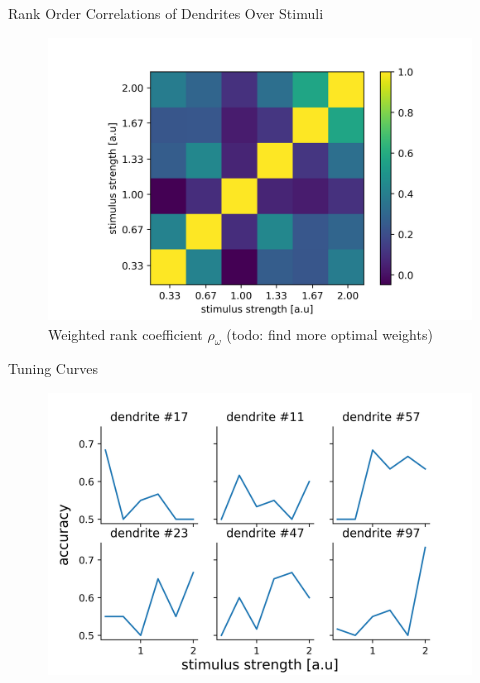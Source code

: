 \documentclass[10pt]{beamer}
\begin{document}
\begin{frame}[fragile]{Rank Order Correlations of Dendrites Over Stimuli}
\begin{center}
	\begin{figure}\caption*{Weighted rank coefficient $\rho_{\omega}$ (todo: find more optimal weights)}
      \includegraphics[width=1.0\textwidth]{rank_presence.png}
	\end{figure}
	\end{center}
\end{frame}

\begin{frame}[fragile]{Tuning Curves}
\begin{center}
	\begin{figure}
      \includegraphics[width=1.0\textwidth]{tuning.png}
	\end{figure}
	\end{center}
\end{frame}
\end{document}
